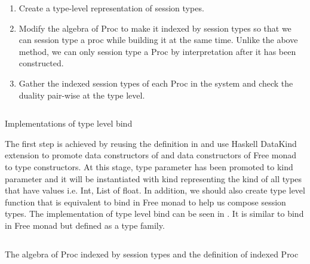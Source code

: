 \begin{enumerate}
    \item Create a type-level representation of session types.
    \item Modify the algebra of Proc to make it indexed by session types so that we can session type a proc while building it at the same time. Unlike the above method, we  can only session type a Proc by interpretation after it has been constructed.
    \item Gather the indexed session types of each Proc in the system and check the duality pair-wise at the type level.
\end{enumerate}
\begin{listing}[ht]
    \inputminted{Haskell}{impl/typebind.hs}
    \caption{Implementations of type level bind}
    \label{impl:code:typebind}
\end{listing}
The first step is achieved by reusing the definition in  and use Haskell DataKind extension to promote data constructors of  and data constructors of Free monad to type constructors. At this stage, type parameter  has been promoted to kind parameter and it will be instantiated with kind \hask{*} representing the kind of all types that have values i.e. Int, List of float. In addition, we should also create type level function that is equivalent to bind in Free monad to help us compose session types. The implementation of type level bind \hask{>*>} can be seen in . It is similar to bind in Free monad but defined as a type family. 
\begin{listing}[ht]
    \inputminted{Haskell}{impl/typeproc.hs}
    \caption{The algebra of Proc indexed by session types and the definition of indexed Proc}
    \label{impl:code:typeproc}
\end{listing}

